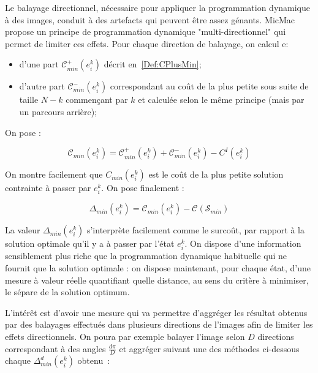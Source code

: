 \label{ProgDyn:MulDir}

Le balayage directionnel, n\'ecessaire pour appliquer la
programmation dynamique \`a des images, conduit \`a des
artefacts qui peuvent \^etre assez g\'enants.
MicMac propose un principe de programmation dynamique "multi-directionnel"
qui permet de limiter ces effets.
Pour chaque direction de balayage, on
calcul e:

\begin{itemize}
   \item d'une part $ \mathcal C^+_{min} (e^k_i)$ d\'ecrit
    en~\ref{Def:CPlusMin};

   \item d'autre part $ \mathcal C^-_{min} (e^k_i)$ correspondant
   au co\^ut de la plus petite sous suite de
   taille $N-k$  commen\c{c}ant par $k$  et calcul\'ee selon
   le m\^eme principe  (mais par un parcours arri\`ere);

\end{itemize}

On pose :

\begin{equation}
  \mathcal C_{min}(e^k_i) = \mathcal C^+_{min} (e^k_i) + \mathcal C^-_{min} (e^k_i) - C^I(e^k_i)
\end{equation}

On montre facilement que $C_{min}(e^k_i)$ est le co\^ut de la plus
petite solution contrainte \`a passer par $e^k_i$.
On pose finalement :

\begin{equation}
    \Delta_{min}(e^k_i) = \mathcal C_{min}(e^k_i) -  \mathcal C ( \mathcal S_{min})
\end{equation}

La valeur $\Delta_{min}(e^k_i)$ s'interpr\`ete facilement comme
le surco\^ut, par rapport \`a la solution optimale qu'il y a \`a passer
par l'\'etat $e^k_i$. On dispose d'une information sensiblement
plus riche que la programmation dynamique  habituelle qui ne fournit
que la solution optimale : on dispose maintenant, pour chaque \'etat,
d'une mesure \`a valeur r\'eelle quantifiant  quelle distance, au sens
du crit\`ere \`a minimiser, le s\'epare de la solution optimum.


L'int\'er\^et est d'avoir une mesure qui va permettre d'aggr\'eger les
r\'esultat obtenus par des balayages effectu\'es dans plusieurs
directions de l'images afin de limiter les effets directionnels.
On poura par exemple balayer l'image selon $D$ directions
correspondant \`a des angles $\frac{d\pi}{D}$ et aggr\'eger
suivant une des m\'ethodes ci-dessous chaque $\Delta^d_{min}(e^k_i)$ obtenu~:

